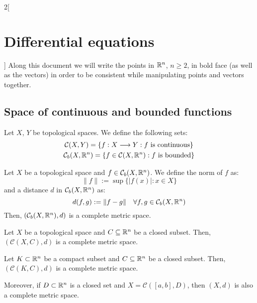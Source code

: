\documentclass[../../../main.tex]{subfiles}
\begin{document}
\begin{multicols}{2}[\section{Differential equations}]
  Along this document we will write the points in $\mathbb{R}^n$, $n\geq 2$, in bold face (as well as the vectors) in order to be consistent while manipulating points and vectors together.
  \subsection{Space of continuous and bounded functions}
  \begin{definition}
    Let $X$, $Y$ be topological spaces. We define the following sets:
    \begin{gather*}
      \mathcal{C}(X,Y)=\{f:X\longrightarrow Y:f\text{ is continuous}\}\\
      \mathcal{C}_b(X,\mathbb{R}^n)=\{f\in\mathcal{C}(X,\mathbb{R}^n):f\text{ is bounded}\}
    \end{gather*}
  \end{definition}
  \begin{theorem}
    Let $X$ be a topological space and $f\in\mathcal{C}_b(X,\mathbb{R}^n)$. We define the norm of $f$ as: $$\|f\|:=\sup\{|f(x)|:x\in X\}$$ and a distance $d$ in $\mathcal{C}_b(X,\mathbb{R}^n)$ as: $$d(f,g):=\|f-g\|\quad\forall f,g\in\mathcal{C}_b(X,\mathbb{R}^n)$$
    Then, $(\mathcal{C}_b(X,\mathbb{R}^n),d)$ is a complete metric space.
  \end{theorem}
  \begin{theorem}
    Let $X$ be a topological space and $C\subseteq\mathbb{R}^n$ be a closed subset. Then, $(\mathcal{C}(X,C),d)$ is a complete metric space.
  \end{theorem}
  \begin{corollary}
    Let $K\subset \mathbb{R}^n$ be a compact subset and $C\subseteq\mathbb{R}^n$ be a closed subset. Then, $(\mathcal{C}(K,C),d)$ is a complete metric space.
  \end{corollary}
  \begin{corollary}
    Moreover, if $D\subset\mathbb{R}^n$ is a closed set and $X=\mathcal{C}([a,b],D)$, then $(X,d)$ is also a complete metric space.
  \end{corollary}

\end{multicols}
\end{document}
